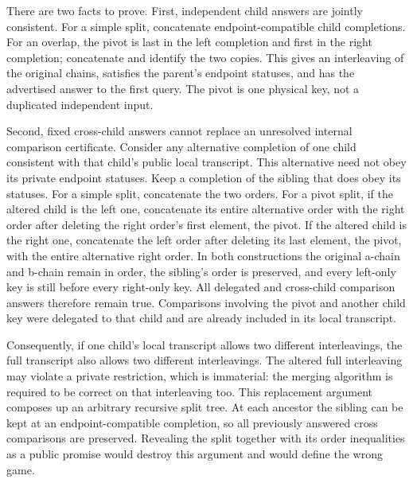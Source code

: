 \documentclass[11pt]{article}
\theoremstyle{definition}
\theoremstyle{remark}
\begin{document}
There are two facts to prove.  First, independent child answers are
jointly consistent.  For a simple split, concatenate endpoint-compatible
child completions.  For an overlap, the pivot is last in the left
completion and first in the right completion; concatenate and identify
the two copies.  This gives an interleaving of the original chains,
satisfies the parent's endpoint statuses, and has the advertised answer
to the first query.  The pivot is one physical key, not a duplicated
independent input.

Second, fixed cross-child answers cannot replace an unresolved internal
comparison certificate.  Consider any alternative completion of one
child consistent with that child's public local transcript.  This
alternative need not obey its private endpoint statuses.  Keep a
completion of the sibling that does obey its statuses.  For a simple
split, concatenate the two orders.  For a pivot split, if the altered
child is the left one, concatenate its entire alternative order with the
right order after deleting the right order's first element, the pivot.
If the altered child is the right one, concatenate the left order after
deleting its last element, the pivot, with the entire alternative right
order.  In both constructions the original a-chain and b-chain remain
in order, the sibling's order is preserved, and every left-only key is
still before every right-only key.  All delegated and cross-child
comparison answers therefore remain true.  Comparisons involving the
pivot and another child key were delegated to that child and are already
included in its local transcript.

Consequently, if one child's local transcript allows two different
interleavings, the full transcript also allows two different
interleavings.  The altered full interleaving may violate a private
restriction, which is immaterial: the merging algorithm is required to
be correct on that interleaving too.  This replacement argument composes
up an arbitrary recursive split tree.  At each ancestor the sibling can
be kept at an endpoint-compatible completion, so all previously answered
cross comparisons are preserved.  Revealing the split together with its
order inequalities as a public promise would destroy this argument and
would define the wrong game.
\end{document}
